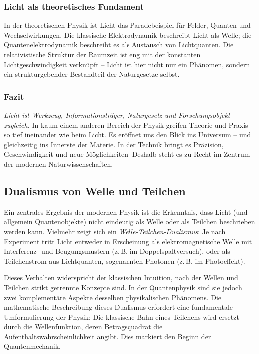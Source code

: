 \subsubsection*{Licht als theoretisches Fundament}
In der theoretischen Physik ist Licht das Paradebeispiel für Felder, Quanten und Wechselwirkungen. Die klassische Elektrodynamik beschreibt Licht als Welle; die Quantenelektrodynamik beschreibt es als Austausch von Lichtquanten. Die relativistische Struktur der Raumzeit ist eng mit der konstanten Lichtgeschwindigkeit verknüpft – Licht ist hier nicht nur ein Phänomen, sondern ein strukturgebender Bestandteil der Naturgesetze selbst.
\newpage
\noindent
\subsubsection{Fazit}
\emph{Licht ist Werkzeug, Informationsträger, Naturgesetz und Forschungsobjekt zugleich.} In kaum einem anderen Bereich der Physik greifen Theorie und Praxis so tief ineinander wie beim Licht. Es eröffnet uns den Blick ins Universum – und gleichzeitig ins Innerste der Materie. In der Technik bringt es Präzision, Geschwindigkeit und neue Möglichkeiten. Deshalb steht es zu Recht im Zentrum der modernen Naturwissenschaften.

\subsection{Dualismus von Welle und Teilchen}

Ein zentrales Ergebnis der modernen Physik ist die Erkenntnis, dass Licht (und allgemein Quantenobjekte) nicht eindeutig als Welle oder als Teilchen beschrieben werden kann. Vielmehr zeigt sich ein \emph{Welle-Teilchen-Dualismus}: Je nach Experiment tritt Licht entweder in Erscheinung als elektromagnetische Welle mit Interferenz- und Beugungsmustern (z.\,B. im Doppelspaltversuch), oder als Teilchenstrom aus Lichtquanten, sogenannten Photonen (z.\,B. im Photoeffekt).

Dieses Verhalten widerspricht der klassischen Intuition, nach der Wellen und Teilchen strikt getrennte Konzepte sind. In der Quantenphysik sind sie jedoch zwei komplementäre Aspekte desselben physikalischen Phänomens. Die mathematische Beschreibung dieses Dualismus erfordert eine fundamentale Umformulierung der Physik: Die klassische Bahn eines Teilchens wird ersetzt durch die Wellenfunktion, deren Betragsquadrat die Aufenthaltswahrscheinlichkeit angibt. Dies markiert den Beginn der Quantenmechanik.

